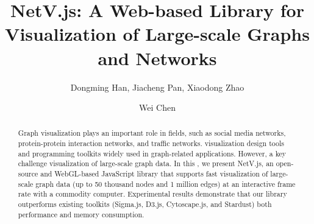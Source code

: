 \documentclass[5p]{elsarticle}
\newcommand{\name}{NetV.js\xspace}
\begin{document}
\begin{CJK}{UTF8}{gbsn}
\begin{frontmatter}

\title{\name: A Web-based Library for  Visualization of Large-scale Graphs and Networks }

\author[mymainaddress,mysecondaryaddress]{Dongming Han, Jiacheng Pan, Xiaodong Zhao}
\author[mymainaddress]{Wei Chen}

\address[mymainaddress]{State Key Lab of CAD\&CG, Zhejiang University, Hangzhou, Zhejiang, China}
\address[mysecondaryaddress]{Zhejiang Lab, hangzhou, zhejiang, China}

\begin{abstract}
    Graph visualization plays an important role in  fields, such as social media networks, protein-protein interaction networks, and traffic networks.  visualization design tools and programming toolkits  widely used in graph-related applications. However, a key challenge  visualization of large-scale graph data. In this , we present \name, an open-source and WebGL-based JavaScript library that supports fast visualization of large-scale graph data (up to 50 thousand nodes and 1 million edges) at an interactive frame rate with a commodity computer. Experimental results demonstrate that our library outperforms existing toolkits (Sigma.js, D3.js, Cytoscape.js, and Stardust)  both  performance and memory consumption.

\end{abstract}
 
\begin{keyword}
\end{keyword}


\end{frontmatter}
\end{CJK}
\end{document}
